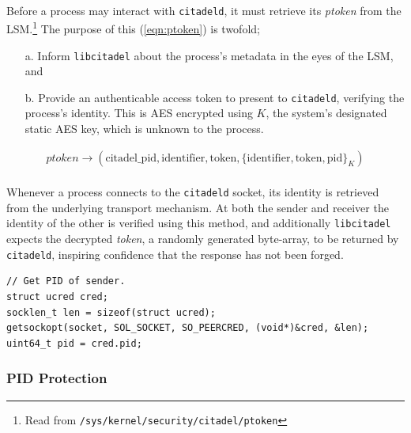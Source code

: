 \paragraph{} Before a process may interact with \texttt{citadeld}, it must retrieve its \textit{ptoken} from the LSM.\footnote{Read from \texttt{/sys/kernel/security/citadel/ptoken}} The purpose of this (\ref{eqn:ptoken}) is twofold;
\begin{enumerate}
    \item[a.] Inform \texttt{libcitadel} about the process's metadata in the eyes of the LSM, and
    \item[b.] Provide an authenticable access token to present to \texttt{citadeld}, verifying the process's identity. This is AES encrypted using $K$, the system's designated static AES key, which is unknown to the process. 
\end{enumerate}

\vspace{-7mm}
\begin{align}
    \textit{ptoken} \rightarrow ( \text{citadel\_pid}, \text{identifier}, \text{token}, \{\text{identifier}, \text{token}, \text{pid}\}_K) \label{eqn:ptoken}
\end{align}

\paragraph{} Whenever a process connects to the \texttt{citadeld} socket, its identity is retrieved from the underlying transport mechanism. At both the sender and receiver the identity of the other is verified using this method, and additionally \texttt{libcitadel} expects the decrypted \textit{token}, a randomly generated byte-array, to be returned by \texttt{citadeld}, inspiring confidence that the response has not been forged.

\begin{verbatim}
// Get PID of sender.
struct ucred cred;
socklen_t len = sizeof(struct ucred);
getsockopt(socket, SOL_SOCKET, SO_PEERCRED, (void*)&cred, &len);
uint64_t pid = cred.pid;
\end{verbatim}

\subsubsection{PID Protection}
\label{sec:pid-protection}
